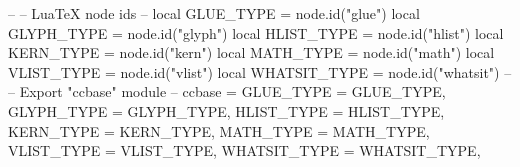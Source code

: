 \egroup
%
%
\luacode
--
-- LuaTeX node ids
--
local GLUE_TYPE    = node.id("glue")
local GLYPH_TYPE   = node.id("glyph")
local HLIST_TYPE   = node.id("hlist")
local KERN_TYPE    = node.id("kern")
local MATH_TYPE    = node.id("math")
local VLIST_TYPE   = node.id("vlist")
local WHATSIT_TYPE = node.id("whatsit")
--
-- Export "ccbase" module
--
ccbase = {
  GLUE_TYPE    = GLUE_TYPE,
  GLYPH_TYPE   = GLYPH_TYPE,
  HLIST_TYPE   = HLIST_TYPE,
  KERN_TYPE    = KERN_TYPE,
  MATH_TYPE    = MATH_TYPE,
  VLIST_TYPE   = VLIST_TYPE,
  WHATSIT_TYPE = WHATSIT_TYPE,
}
\endluacode
\endinput
